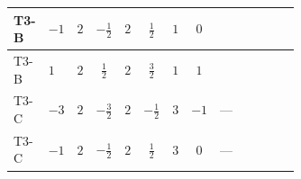 \documentclass[8pt]{article}
\begin{document}
\begin{landscape}
\begin{longtable}{@{}llcccccc >{\raggedright\arraybackslash}p{0.21\linewidth} >{\raggedright\arraybackslash}p{0.21\linewidth} >{\raggedright\arraybackslash}p{0.21\linewidth}@{}}
\midrule
T3-B & $-1$ & $2$ & $-\frac{1}{2}$ & $2$ & $\frac{1}{2}$ & $1$ & $0$ & \scriptsize\adjustbox{max width=\linewidth}{$\begin{gathered} {\lambda_{HS_2}^{(1)}} (2 T_{\nu}^{(2)}+6 \operatorname{Tr}\!\left({Y_d}\,\left({Y_d}\right)^{\dagger}\right)+2 \operatorname{Tr}\!\left({Y_e}\,\left({Y_e}\right)^{\dagger}\right)+6 \operatorname{Tr}\!\left({Y_u}\,\left({Y_u}\right)^{\dagger}\right))\end{gathered}$} & \scriptsize\adjustbox{max width=\linewidth}{$\begin{gathered} +\frac{9 {g_2}^4}{4}\end{gathered}$} & \scriptsize\adjustbox{max width=\linewidth}{$\begin{gathered} -9 {g_2}^2 {\lambda_{HS_2}^{(1)}}\end{gathered}$} \\
\midrule
T3-B & $1$ & $2$ & $\frac{1}{2}$ & $2$ & $\frac{3}{2}$ & $1$ & $1$ & \scriptsize\adjustbox{max width=\linewidth}{$\begin{gathered} {\lambda_{HS_2}^{(1)}} (2 T_{\nu}^{(2)}+6 \operatorname{Tr}\!\left({Y_d}\,\left({Y_d}\right)^{\dagger}\right)+2 \operatorname{Tr}\!\left({Y_e}\,\left({Y_e}\right)^{\dagger}\right)+6 \operatorname{Tr}\!\left({Y_u}\,\left({Y_u}\right)^{\dagger}\right))\end{gathered}$} & \scriptsize\adjustbox{max width=\linewidth}{$\begin{gathered} +\frac{9 {g_2}^4}{4}\end{gathered}$} & \scriptsize\adjustbox{max width=\linewidth}{$\begin{gathered} -9 {g_2}^2 {\lambda_{HS_2}^{(1)}}\end{gathered}$} \\
\midrule
T3-C & $-3$ & $2$ & $-\frac{3}{2}$ & $2$ & $-\frac{1}{2}$ & $3$ & $-1$ & --- & \scriptsize\adjustbox{max width=\linewidth}{$\begin{gathered} +\frac{9 {g_2}^4}{4}\end{gathered}$} & \scriptsize\adjustbox{max width=\linewidth}{$\begin{gathered} -9 {g_2}^2 {\lambda_{HS_2}^{(1)}}\end{gathered}$} \\
\midrule
T3-C & $-1$ & $2$ & $-\frac{1}{2}$ & $2$ & $\frac{1}{2}$ & $3$ & $0$ & --- & \scriptsize\adjustbox{max width=\linewidth}{$\begin{gathered} +\frac{9 {g_2}^4}{4}\end{gathered}$} & \scriptsize\adjustbox{max width=\linewidth}{$\begin{gathered} -9 {g_2}^2 {\lambda_{HS_2}^{(1)}}\end{gathered}$} \\

\end{longtable}
\end{landscape}
\end{document}
